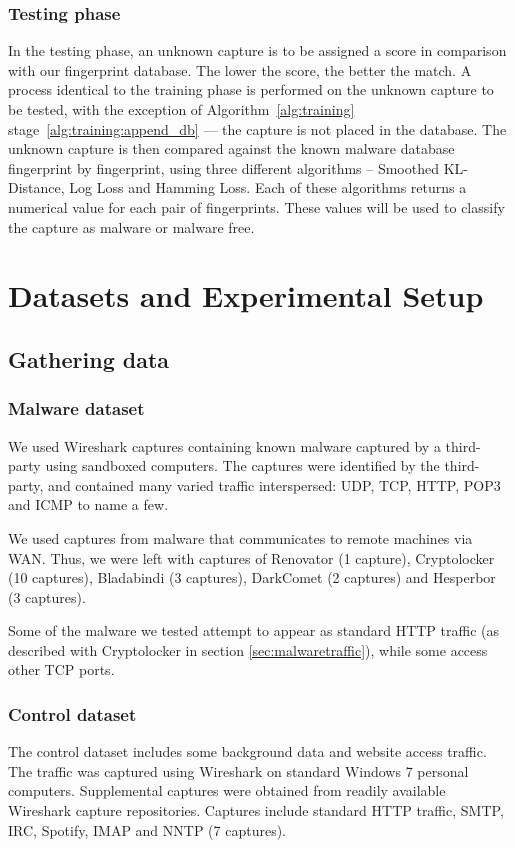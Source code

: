 \documentclass[9pt,journal,compsoc]{IEEEtran}
\begin{document}
\subsubsection{Testing phase}
In the testing phase, an unknown capture is to be assigned a score in comparison with our fingerprint database. The lower the score, the better the match.
A process identical to the training phase is performed on the unknown capture to be tested, with the exception of Algorithm~\ref{alg:training} stage~\ref{alg:training:append_db} --- the capture is not placed in the database. 
The unknown capture is then compared against the known malware database fingerprint by fingerprint, using three different algorithms – Smoothed KL-Distance, Log Loss and Hamming Loss.
Each of these algorithms returns a numerical value for each pair of fingerprints. These values will be used to classify the capture as malware or malware free.
\section{Datasets and Experimental Setup}
\subsection{Gathering data}
\subsubsection{Malware dataset}
We used Wireshark captures containing known malware captured by a third-party using sandboxed computers.
The captures were identified by the third-party, and contained many varied traffic interspersed: UDP, TCP, HTTP, POP3 and ICMP to name a few.

We used captures from malware that communicates to remote machines via WAN.
Thus, we were left with captures of Renovator (1 capture),  Cryptolocker (10 captures), Bladabindi (3 captures), DarkComet (2 captures) and Hesperbor (3 captures).

Some of the malware we tested attempt to appear as standard HTTP traffic (as described with Cryptolocker in section \ref{sec:malwaretraffic}), while some access other TCP ports.
\subsubsection{Control dataset}
The control dataset includes some background data and website access traffic.
The traffic was captured using Wireshark on standard Windows 7 personal computers. Supplemental captures were obtained from readily available Wireshark capture repositories.
Captures include standard HTTP traffic, SMTP, IRC, Spotify, IMAP and NNTP (7 captures).
\end{document}
